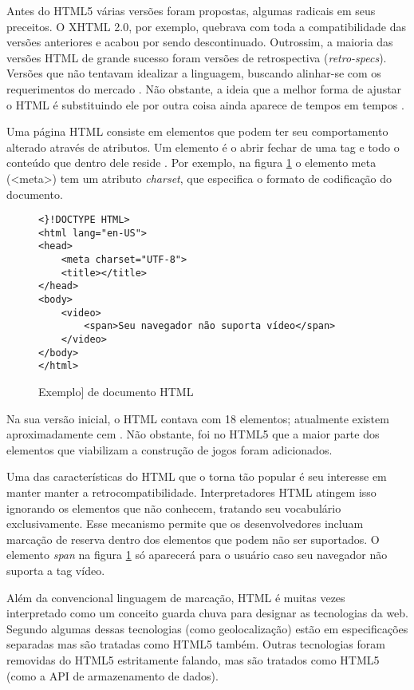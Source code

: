Antes do HTML5 várias versões foram propostas, algumas radicais
em seus preceitos. O XHTML 2.0, por exemplo, quebrava com toda
a compatibilidade das versões anteriores e acabou por sendo descontinuado.
Outrossim, a maioria das versões HTML de grande sucesso foram versões de
retrospectiva (\textit{retro-specs}). Versões que não tentavam
idealizar a linguagem, buscando alinhar-se com os requerimentos do
mercado \autocite{diveIntohtml}. Não obstante, a ideia que a melhor forma
de ajustar o HTML é substituindo ele por outra coisa ainda aparece de tempos
em tempos \autocite{diveIntohtml}.

Uma página HTML consiste em elementos que podem ter seu comportamento
alterado através de atributos. Um elemento é o abrir fechar de
uma tag e todo o conteúdo que dentro dele reside \autocite[pp.
10--11]{htmlAndCssDucket}. Por exemplo, na figura \ref{fig:htmlSample} o elemento
meta (<meta>) tem um atributo \textit{charset}, que especifica o formato de 
codificação do documento.

\begin{figure}
\centering
\begin{verbatim}
<}!DOCTYPE HTML>
<html lang="en-US">
<head>
	<meta charset="UTF-8">
	<title></title>
</head>
<body>
    <video>
        <span>Seu navegador não suporta vídeo</span>
    </video>
</body>
</html>
\end{verbatim}
\caption{Exemplo] de documento HTML}
\label{fig:htmlSample}
\end{figure}


Na sua versão inicial, o HTML contava com 18 elementos; atualmente
existem aproximadamente cem \autocite{diveIntohtml}. Não obstante, foi
no HTML5 que a maior parte dos elementos que viabilizam a construção
de jogos foram adicionados.

Uma das características do HTML que o torna tão popular é seu
interesse em manter manter a retrocompatibilidade. Interpretadores
HTML atingem isso ignorando os elementos que não conhecem, tratando
seu vocabulário exclusivamente. Esse mecanismo permite que os
desenvolvedores incluam marcação de reserva dentro dos elementos
que podem não ser suportados. O elemento \textit{span} na figura
\ref{fig:htmlSample} só aparecerá para o usuário caso seu navegador
não suporta a tag vídeo.

Além da convencional linguagem de marcação, HTML é muitas vezes
interpretado como um conceito guarda chuva para designar as tecnologias
da web. Segundo \autocite{diveIntohtml} algumas dessas tecnologias (como geolocalização) estão em especificações separadas mas são tratadas como HTML5 também. Outras
tecnologias foram removidas do HTML5 estritamente falando, mas são tratados
como HTML5 (como a API de armazenamento de dados).

